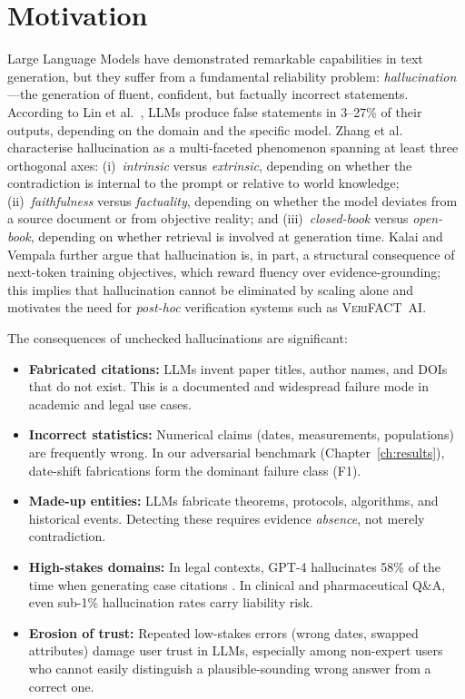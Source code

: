 \documentclass[12pt, a4paper, oneside]{report}
\newcommand{\verifact}{\textsc{VeriFACT~AI}}
\begin{document}
\section{Motivation}

Large Language Models have demonstrated remarkable capabilities in text generation, but they suffer from a fundamental reliability problem: \emph{hallucination}---the generation of fluent, confident, but factually incorrect statements. According to Lin et al.\ \cite{lin2022truthfulqa}, LLMs produce false statements in 3--27\% of their outputs, depending on the domain and the specific model. Zhang et al.\ \cite{zhang2025survey} characterise hallucination as a multi-faceted phenomenon spanning at least three orthogonal axes: (i)~\emph{intrinsic} versus \emph{extrinsic}, depending on whether the contradiction is internal to the prompt or relative to world knowledge; (ii)~\emph{faithfulness} versus \emph{factuality}, depending on whether the model deviates from a source document or from objective reality; and (iii)~\emph{closed-book} versus \emph{open-book}, depending on whether retrieval is involved at generation time. Kalai and Vempala \cite{kalai2025why} further argue that hallucination is, in part, a structural consequence of next-token training objectives, which reward fluency over evidence-grounding; this implies that hallucination cannot be eliminated by scaling alone and motivates the need for \emph{post-hoc} verification systems such as \verifact{}.

The consequences of unchecked hallucinations are significant:
\begin{itemize}[nosep]
    \item \textbf{Fabricated citations:} LLMs invent paper titles, author names, and DOIs that do not exist. This is a documented and widespread failure mode in academic and legal use cases.
    \item \textbf{Incorrect statistics:} Numerical claims (dates, measurements, populations) are frequently wrong. In our adversarial benchmark (Chapter~\ref{ch:results}), date-shift fabrications form the dominant failure class (F1).
    \item \textbf{Made-up entities:} LLMs fabricate theorems, protocols, algorithms, and historical events. Detecting these requires evidence \emph{absence}, not merely contradiction.
    \item \textbf{High-stakes domains:} In legal contexts, GPT-4 hallucinates 58\% of the time when generating case citations \cite{dahl2024legal}. In clinical and pharmaceutical Q\&A, even sub-1\% hallucination rates carry liability risk.
    \item \textbf{Erosion of trust:} Repeated low-stakes errors (wrong dates, swapped attributes) damage user trust in LLMs, especially among non-expert users who cannot easily distinguish a plausible-sounding wrong answer from a correct one.
\end{itemize}
\end{document}

